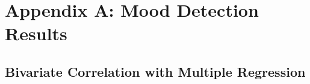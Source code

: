 
\chapter{Appendix A: Mood Detection Results} %

\label{AppendixA} %


\section{Bivariate Correlation with Multiple Regression}